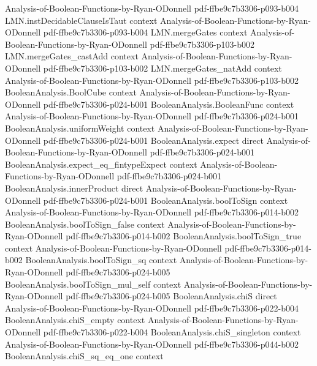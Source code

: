 \begin{theorem}
  {Analysis-of-Boolean-Functions-by-Ryan-ODonnell}
  {pdf-ffbe9c7b3306-p093-b004}
\proofstep
  {LMN.instDecidableClauseIsTaut}
  {context}
  {Analysis-of-Boolean-Functions-by-Ryan-ODonnell}
  {pdf-ffbe9c7b3306-p093-b004}
\proofstep
  {LMN.mergeGates}
  {context}
  {Analysis-of-Boolean-Functions-by-Ryan-ODonnell}
  {pdf-ffbe9c7b3306-p103-b002}
\proofstep
  {LMN.mergeGates_castAdd}
  {context}
  {Analysis-of-Boolean-Functions-by-Ryan-ODonnell}
  {pdf-ffbe9c7b3306-p103-b002}
\proofstep
  {LMN.mergeGates_natAdd}
  {context}
  {Analysis-of-Boolean-Functions-by-Ryan-ODonnell}
  {pdf-ffbe9c7b3306-p103-b002}
\proofstep
  {BooleanAnalysis.BoolCube}
  {context}
  {Analysis-of-Boolean-Functions-by-Ryan-ODonnell}
  {pdf-ffbe9c7b3306-p024-b001}
\proofstep
  {BooleanAnalysis.BooleanFunc}
  {context}
  {Analysis-of-Boolean-Functions-by-Ryan-ODonnell}
  {pdf-ffbe9c7b3306-p024-b001}
\proofstep
  {BooleanAnalysis.uniformWeight}
  {context}
  {Analysis-of-Boolean-Functions-by-Ryan-ODonnell}
  {pdf-ffbe9c7b3306-p024-b001}
\proofstep
  {BooleanAnalysis.expect}
  {direct}
  {Analysis-of-Boolean-Functions-by-Ryan-ODonnell}
  {pdf-ffbe9c7b3306-p024-b001}
\proofstep
  {BooleanAnalysis.expect_eq_fintypeExpect}
  {context}
  {Analysis-of-Boolean-Functions-by-Ryan-ODonnell}
  {pdf-ffbe9c7b3306-p024-b001}
\proofstep
  {BooleanAnalysis.innerProduct}
  {direct}
  {Analysis-of-Boolean-Functions-by-Ryan-ODonnell}
  {pdf-ffbe9c7b3306-p024-b001}
\proofstep
  {BooleanAnalysis.boolToSign}
  {context}
  {Analysis-of-Boolean-Functions-by-Ryan-ODonnell}
  {pdf-ffbe9c7b3306-p014-b002}
\proofstep
  {BooleanAnalysis.boolToSign_false}
  {context}
  {Analysis-of-Boolean-Functions-by-Ryan-ODonnell}
  {pdf-ffbe9c7b3306-p014-b002}
\proofstep
  {BooleanAnalysis.boolToSign_true}
  {context}
  {Analysis-of-Boolean-Functions-by-Ryan-ODonnell}
  {pdf-ffbe9c7b3306-p014-b002}
\proofstep
  {BooleanAnalysis.boolToSign_sq}
  {context}
  {Analysis-of-Boolean-Functions-by-Ryan-ODonnell}
  {pdf-ffbe9c7b3306-p024-b005}
\proofstep
  {BooleanAnalysis.boolToSign_mul_self}
  {context}
  {Analysis-of-Boolean-Functions-by-Ryan-ODonnell}
  {pdf-ffbe9c7b3306-p024-b005}
\proofstep
  {BooleanAnalysis.chiS}
  {direct}
  {Analysis-of-Boolean-Functions-by-Ryan-ODonnell}
  {pdf-ffbe9c7b3306-p022-b004}
\proofstep
  {BooleanAnalysis.chiS_empty}
  {context}
  {Analysis-of-Boolean-Functions-by-Ryan-ODonnell}
  {pdf-ffbe9c7b3306-p022-b004}
\proofstep
  {BooleanAnalysis.chiS_singleton}
  {context}
  {Analysis-of-Boolean-Functions-by-Ryan-ODonnell}
  {pdf-ffbe9c7b3306-p044-b002}
\proofstep
  {BooleanAnalysis.chiS_sq_eq_one}
  {context}

\end{theorem}
